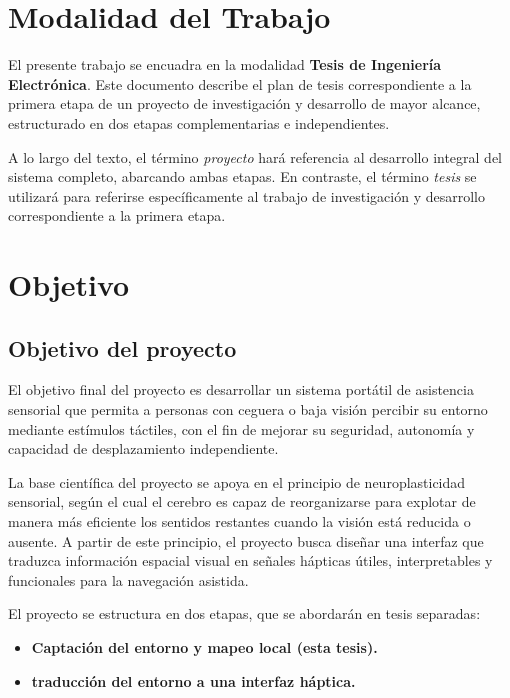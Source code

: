 
\section{Modalidad del Trabajo}

El presente trabajo se encuadra en la modalidad \textbf{Tesis de Ingeniería Electrónica}. Este documento describe
el plan de tesis correspondiente a la primera etapa de un proyecto de investigación y desarrollo de mayor alcance,
estructurado en dos etapas complementarias e independientes.

A lo largo del texto, el término \textit{proyecto} hará referencia al desarrollo integral del sistema completo,
abarcando ambas etapas. En contraste, el término \textit{tesis} se utilizará para referirse específicamente al
trabajo de investigación y desarrollo correspondiente a la primera etapa.

\section{Objetivo}

\subsection{Objetivo del proyecto}

El objetivo final del proyecto es desarrollar un sistema portátil de asistencia sensorial que permita a personas con ceguera o baja visión
percibir su entorno mediante estímulos táctiles, con el fin de mejorar su seguridad, autonomía y capacidad de desplazamiento independiente.

La base científica del proyecto se apoya en el principio de neuroplasticidad sensorial, según el cual el cerebro es capaz de reorganizarse
para explotar de manera más eficiente los sentidos restantes cuando la visión está reducida o ausente. A partir de este principio, el
proyecto busca diseñar una interfaz que traduzca información espacial visual en señales hápticas útiles, interpretables y funcionales
para la navegación asistida.

El proyecto se estructura en dos etapas, que se abordarán en tesis separadas:
\begin{itemize}
    \item \textbf{Captación del entorno y mapeo local (esta tesis).}
    \item \textbf{traducción del entorno a una interfaz háptica.}
\end{itemize}

